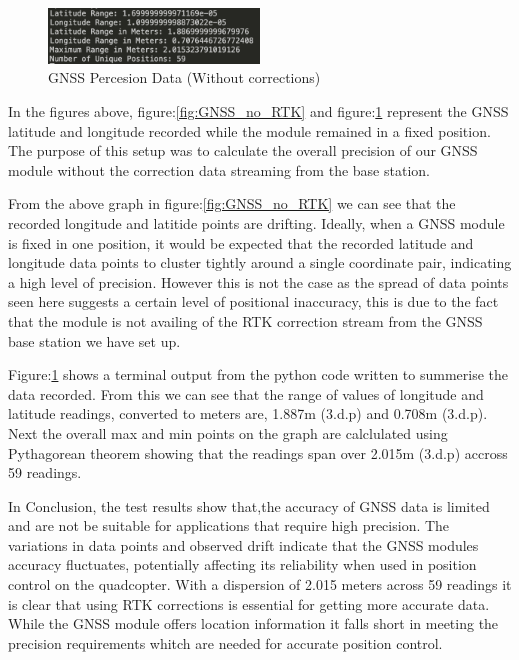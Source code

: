 \documentclass{article}
\begin{document}
\begin{figure}[H]
  \centering
  \includegraphics[width=0.5\textwidth]{Pictures/GNSS_data_no_correction.png}
  \caption{GNSS Percesion Data (Without corrections)}
  \label{fig:GNSS_data_no_RTK}
\end{figure}
In the figures above, figure:\ref{fig:GNSS_no_RTK} and
figure:\ref{fig:GNSS_data_no_RTK} represent the GNSS latitude and longitude
recorded while the module remained in a fixed position. The purpose of this
setup was to calculate the overall precision of our GNSS module without the
correction data streaming from the base station.

From the above graph in figure:\ref{fig:GNSS_no_RTK} we can see that the
recorded longitude and latitide points are drifting. Ideally, when a GNSS module
is fixed in one position, it would be expected that the recorded latitude and
longitude data points to cluster tightly around a single coordinate pair,
indicating a high level of precision. However this is not the case as the spread
of data points seen here suggests a certain level of positional inaccuracy, this
is due to the fact that the module is not availing of the RTK correction stream
from the GNSS base station we have set up. 

Figure:\ref{fig:GNSS_data_no_RTK} shows a terminal output from the python code
written to summerise the data recorded. From this we can see that the range of
values of longitude and latitude readings, converted to meters are, 1.887m
(3.d.p) and  0.708m (3.d.p). Next the overall max and min points on the graph
are calclulated using Pythagorean theorem showing that the readings span over
2.015m (3.d.p) accross 59 readings.

In Conclusion, the test results show that,the accuracy of GNSS data is limited
and are not be suitable for applications that require high precision. The
variations in data points and observed drift indicate that the GNSS modules
accuracy fluctuates, potentially affecting its reliability when used in position
control on the quadcopter. With a dispersion of 2.015 meters across 59 readings
it is clear that using RTK corrections is essential for getting more accurate
data. While the GNSS module offers location information it falls short in
meeting the precision requirements whitch are needed for accurate position
control.
\end{document}
